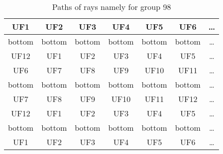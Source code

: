 \begin{table}[h!]
\centering
\begin{tabular}{|c|c|c|c|c|c|c|}
\hline
UF1 & UF2 & UF3 & UF4 & UF5 & UF6 & \dots \\
\hline
bottom & bottom & bottom & bottom & bottom & bottom & \dots \\
\hline
UF12 & UF1 & UF2 & UF3 & UF4 & UF5 & \dots \\
\hline
UF6 & UF7 & UF8 & UF9 & UF10 & UF11 & \dots \\
\hline
bottom & bottom & bottom & bottom & bottom & bottom & \dots \\
\hline
UF7 & UF8 & UF9 & UF10 & UF11 & UF12 & \dots \\
\hline
UF12 & UF1 & UF2 & UF3 & UF4 & UF5 & \dots \\
\hline
bottom & bottom & bottom & bottom & bottom & bottom & \dots \\
\hline
UF1 & UF2 & UF3 & UF4 & UF5 & UF6 & \dots \\
\hline
\end{tabular}
\caption{Paths of rays namely for group 98}
\label{table:TableGroup98}
\end{table}
\newpage
